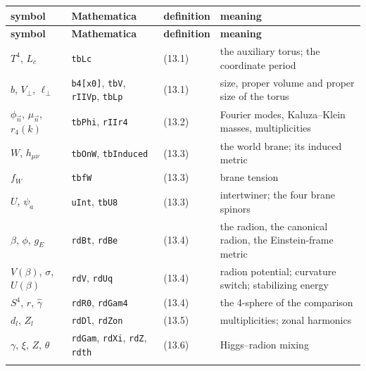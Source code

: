 \documentclass[10pt,a4paper]{article}
\begin{document}
{\footnotesize
\begin{longtable}{>{\raggedright\arraybackslash}p{}>{\raggedright\arraybackslash}p{}>{\raggedright\arraybackslash}p{}>{\raggedright\arraybackslash}p{}}
\toprule
\textbf{symbol} & \textbf{Mathematica} & \textbf{definition} & \textbf{meaning} \\
\midrule\endfirsthead
\toprule
\textbf{symbol} & \textbf{Mathematica} & \textbf{definition} & \textbf{meaning} \\
\midrule\endhead
\endfoot
\bottomrule\endlastfoot
$T^4$, $L_c$ & \texttt{tbLc} & (13.1) & the auxiliary torus; the coordinate period \\
$b$, $V_\perp$, $\ell_\perp$ & \texttt{b4[x0]}, \texttt{tbV}, \texttt{rIIVp}, \texttt{tbLp} & (13.1) & size, proper volume and proper size of the torus \\
$\phi_{\vec n}$, $\mu_{\vec n}$, $r_4(k)$ & \texttt{tbPhi}, \texttt{rIIr4} & (13.2) & Fourier modes, Kaluza–Klein masses, multiplicities \\
$W$, $h_{\mu\nu}$ & \texttt{tbOnW}, \texttt{tbInduced} & (13.3) & the world brane; its induced metric \\
$f_W$ & \texttt{tbfW} & (13.3) & brane tension \\
$U$, $\psi_a$ & \texttt{uInt}, \texttt{tbU8} & (13.3) & intertwiner; the four brane spinors \\
$\beta$, $\phi$, $g_E$ & \texttt{rdBt}, \texttt{rdBe} & (13.4) & the radion, the canonical radion, the Einstein-frame metric \\
$V(\beta)$, $\sigma$, $U(\beta)$ & \texttt{rdV}, \texttt{rdUq} & (13.4) & radion potential; curvature switch; stabilizing energy \\
$S^4$, $r$, $\hat\gamma$ & \texttt{rdR0}, \texttt{rdGam4} & (13.4) & the 4-sphere of the comparison \\
$d_l$, $Z_l$ & \texttt{rdDl}, \texttt{rdZon} & (13.5) & multiplicities; zonal harmonics \\
$\gamma$, $\xi$, $Z$, $\theta$ & \texttt{rdGam}, \texttt{rdXi}, \texttt{rdZ}, \texttt{rdth} & (13.6) & Higgs–radion mixing \\*
\end{longtable}}
\end{document}
